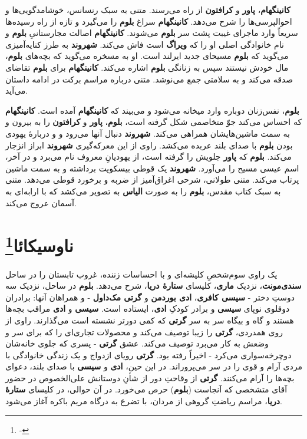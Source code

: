 \documentclass[12pt]{book}
\newcommand{\noun}[1]{{\textbf{#1}}}
\begin{document}
    \noun{کانینگهام}، \noun{پاور} و \noun{کرافتون} از راه می‌رسند. متنی به سبک رنسانس، خوشامدگویی‌ها و احوالپرسی‌ها را شرح می‌دهد. \noun{کانینگهام} سراغ \noun{بلوم} را می‌گیرد و تازه از راه رسیده‌ها سریعاً وارد ماجرای غیبت پشت سر \noun{بلوم} می‌شوند. \noun{کانینگهام} اصالت مجارستانیِ \noun{بلوم} و نام خانوادگی اصلی او را که \noun{ویراگ} است فاش می‌کند. \noun{شهروند‬} به طرز کنایه‌آمیزی می‌گوید که \noun{بلوم} مسیحای جدید ایرلند است. او به مسخره می‌گوید که بچه‌های \noun{بلوم}، مال خودش نیستند سپس به زنانگی \noun{بلوم} اشاره می‌کند. \noun{کانینگهام} برای \noun{بلوم} تقاضای صدقه می‌کند و به سلامتی جمع می‌نوشد. متنی درباره مراسم برکت در ادامه داستان می‌آید.

    \noun{بلوم}، نفس‌زنان دوباره وارد میخانه می‌شود و می‌بیند که \noun{کانینگهام} آمده است. \noun{کانینگهام} که احساس می‌کند جوّ متخاصمی شکل گرفته است، \noun{بلوم}، \noun{پاور} و \noun{کرافتون} را به بیرون و به سمت ماشین‌هایشان همراهی می‌کند. \noun{شهروند‬} دنبال آنها می‌رود و و دربارهٔ یهودی بودن \noun{بلوم} با صدای بلند عربده می‌کشد. راوی از این معرکه‌گیری \noun{شهروند‬} ابراز انزجار می‌کند. \noun{بلوم} که \noun{پاور} جلویش را گرفته است، از یهودیانِ معروف نام می‌برد و در آخر، اسم عیسی مسیح را می‌آورد. \noun{شهروند‬} یک قوطی بیسکویت برداشته و به سمت ماشین پرتاب می‌کند. متنی طولانی، شرحی اغراق‌آمیز از ضربه و برخورد قوطی می‌دهد. متنی به سبک کتاب مقدس، \noun{بلوم} را به صورت \noun{الیاس} به تصویر می‌کشد که با ارابه‌ای به آسمان عروج می‌کند.

    \chapter[ناوسیکائا]{ناوسیکائا\protect\footnote{-}}\label{ep:13}
    یک راوی سوم‌شخصِ کلیشه‌ای و با احساسات زننده، غروب تابستان را در ساحل \noun{سندی‌مونت}، نزدیک \noun{ماری}، کلیسای \noun{ستارهٔ دریا}، شرح می‌دهد. \noun{بلوم} در ساحل، نزدیک سه دوستِ دختر - \noun{سیسی کافری}، \noun{ادی بوردمن} و \noun{گرتی مک‌داول‬} - و همراهان آنها: برادران دوقلوی نوپای \noun{سیسی} و برادر کودکِ \noun{ادی}، ایستاده است. \noun{سیسی} و \noun{ادی} مراقب بچه‌ها هستند و گاه و بیگاه سر به سر \noun{گرتی} که کمی دورتر نشسته است می‌گذارند. راوی از روی همدردی، \noun{گرتی} را زیبا توصیف می‌کند و محصولات تجاری‌ای را که برای سر و وضعش به کار می‌برد توصیف می‌کند. عشق \noun{گرتی} - پسری که جلوی خانه‌شان دوچرخه‌سواری می‌کرد - اخیراً رفته بود. \noun{گرتی} رویای ازدواج و یک زندگی خانوادگی با مردی آرام و قوی را در سر می‌پروراند. در این حین، \noun{ادی} و \noun{سیسی} با صدای بلند، دعوای بچه‌ها را آرام می‌کنند. \noun{گرتی} از وقاحتِ دور از شأنِ دوستانش علی‌الخصوص در حضور آقای متشخصی که آنجاست (\noun{بلوم}) حرص می‌خورد. در آن حوالی، در کلیسای \noun{ستارهٔ دریا}، مراسم ریاضتِ گروهی از مردان، با تضرع به درگاه مریم باکره آغاز می‌شود.
\end{document}
